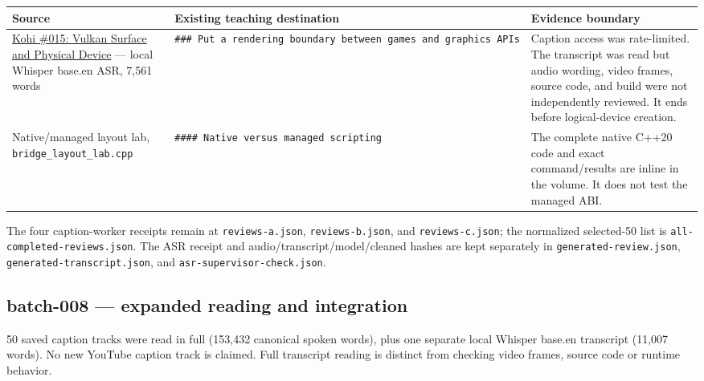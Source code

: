 {\def\LTcaptype{none} %
\begin{longtable}[]{@{}
  >{\raggedright\arraybackslash}p{}
  >{\raggedright\arraybackslash}p{}
  >{\raggedright\arraybackslash}p{}@{}}
\toprule\noalign{}
\begin{minipage}[b]{\linewidth}\raggedright
Source
\end{minipage} & \begin{minipage}[b]{\linewidth}\raggedright
Existing teaching destination
\end{minipage} & \begin{minipage}[b]{\linewidth}\raggedright
Evidence boundary
\end{minipage} \\
\midrule\noalign{}
\endhead
\bottomrule\noalign{}
\endlastfoot
\href{https://www.youtube.com/watch?v=6Kj3O2Ov1RU}{Kohi \#015: Vulkan Surface and Physical Device} --- local Whisper base.en ASR, 7,561 words & \texttt{\#\#\#\ Put\ a\ rendering\ boundary\ between\ games\ and\ graphics\ APIs} & Caption access was rate-limited. The transcript was read but audio wording, video frames, source code, and build were not independently reviewed. It ends before logical-device creation. \\
Native/managed layout lab, \texttt{bridge\_layout\_lab.cpp} & \texttt{\#\#\#\#\ Native\ versus\ managed\ scripting} & The complete native C++20 code and exact command/results are inline in the volume. It does not test the managed ABI. \\
\end{longtable}
}

The four caption-worker receipts remain at \texttt{reviews-a.json}, \texttt{reviews-b.json}, and \texttt{reviews-c.json}; the normalized selected-50 list is \texttt{all-completed-reviews.json}. The ASR receipt and audio/transcript/model/cleaned hashes are kept separately in \texttt{generated-review.json}, \texttt{generated-transcript.json}, and \texttt{asr-supervisor-check.json}.

\subsection{batch-008 --- expanded reading and integration}\label{batch-008-expanded-reading-and-integration}

50 saved caption tracks were read in full (153,432 canonical spoken words), plus one separate local Whisper base.en transcript (11,007 words). No new YouTube caption track is claimed. Full transcript reading is distinct from checking video frames, source code or runtime behavior.

